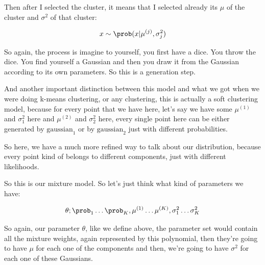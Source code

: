 \documentclass[a4paper, 12pt]{article}
\begin{document}
Then after I selected the cluster, it means that I selected already its \(\mu\)
of the cluster and \(\sigma^2\) of that cluster:

\begin{equation}
\label{eq:orgcbe378d}
x \sim \prob(x|\mu^{(j)}, \sigma_{j}^{2})
\end{equation}

So again, the process is imagine to yourself, you first have a dice. You throw
the dice. You find yourself a Gaussian and then you draw it from the Gaussian
according to its own parameters. So this is a generation step.

And another important distinction between this model and what we got when we
were doing k-means clustering, or any clustering, this is actually a soft
clustering model, because for every point that we have here, let's say we have
some \(\mu^{(1)}\) and \(\sigma_{1}^{2}\) here and \(\mu^{(2)}\) and
\(\sigma_{2}^{2}\) here, every single point here can be either generated by
\(\text{gaussian}_1\) or by \(\text{gaussian}_2\) just with different
probabilities.

So here, we have a much more refined way to talk about our distribution, because
every point kind of belongs to different components, just with different
likelihoods.

So this is our mixture model. So let's just think what kind of parameters we
have:

\begin{equation}
\label{eq:org534a41e}
\theta; \prob_1 \ldots \prob_K, \mu^{(1)} \ldots \mu^{(K)}, \sigma_{1}^{2} \ldots \sigma_{K}^{2}
\end{equation}

So again, our parameter \(\theta\), like we define above, the parameter set
would contain all the mixture weights, again represented by this polynomial,
then they're going to have \(\mu\) for each one of the components and then,
we're going to have \(\sigma^2\) for each one of these Gaussians.
\end{document}
